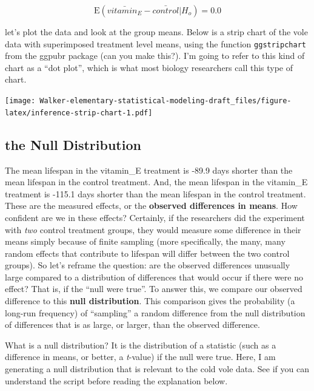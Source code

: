 \documentclass[]{book}
\begin{document}
\begin{equation}
\mathrm{E}(\bar{vitamin_E} - \bar{control} | H_o) = 0.0
\end{equation}

let's plot the data and look at the group means. Below is a strip chart
of the vole data with superimposed treatment level means, using the
function \texttt{ggstripchart} from the ggpubr package (can you make
this?). I'm going to refer to this kind of chart as a ``dot plot'',
which is what most biology researchers call this type of chart.

\texttt{[image: Walker-elementary-statistical-modeling-draft\_files/figure-latex/inference-strip-chart-1.pdf]}

\subsection{the Null Distribution}\label{the-null-distribution}

The mean lifespan in the vitamin\_E treatment is -89.9 days shorter than
the mean lifespan in the control treatment. And, the mean lifespan in
the vitamin\_E treatment is -115.1 days shorter than the mean lifespan
in the control treatment. These are the measured effects, or the
\textbf{observed differences in means}. How confident are we in these
effects? Certainly, if the researchers did the experiment with
\emph{two} control treatment groups, they would measure some difference
in their means simply because of finite sampling (more specifically, the
many, many random effects that contribute to lifespan will differ
between the two control groups). So let's reframe the question: are the
observed differences unusually large compared to a distribution of
differences that would occur if there were no effect? That is, if the
``null were true''. To answer this, we compare our observed difference
to this \textbf{null distribution}. This comparison gives the
probability (a long-run frequency) of ``sampling'' a random difference
from the null distribution of differences that is as large, or larger,
than the observed difference.

What is a null distribution? It is the distribution of a statistic (such
as a difference in means, or better, a \emph{t}-value) if the null were
true. Here, I am generating a null distribution that is relevant to the
cold vole data. See if you can understand the script before reading the
explanation below.
\end{document}
